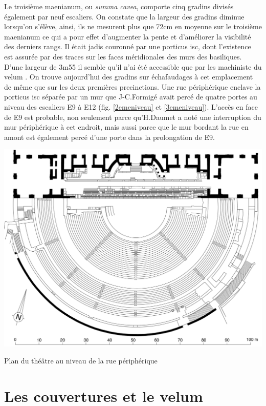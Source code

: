 		
		Le troisième \gls{maenianum}, ou \textit{summa cavea}, comporte cinq gradins divisés également par neuf escaliers. On constate que la largeur des gradins diminue lorsqu'on s'élève, ainsi, ils ne mesurent plus que 72cm en moyenne sur le troisième \gls{maenianum} ce qui a pour effet d'augmenter la pente et d'améliorer la visibilité des derniers rangs. Il était jadis couronné par une \gls{porticus isc}, dont l'existence est assurée par des traces sur les faces méridionales des murs des \glspl{basilique}. D'une largeur de 3m55 il semble qu'il n'ai été accessible que par les machiniste du \gls{velum} \cite{formige}. On trouve aujourd'hui des gradins sur échafaudages à cet emplacement de même que sur les deux premières \glspl{precinction}. Une rue périphérique enclave la \gls{porticus isc} séparée par un mur que J-C.Formigé avait percé de quatre portes au niveau des escaliers E9 à E12 (fig. \ref{2emeniveau} et \ref{3emeniveau}). L'accès en face de E9 est probable, non seulement parce qu'H.Daumet a noté une interruption du mur périphérique à cet endroit, mais aussi parce que le mur bordant la rue en amont est également percé d'une porte dans la prolongation de E9.


	\begin{figureth}
		\includegraphics[width=\linewidth]{images/3emeniveau}
		\caption[Vue de dessus - 3ème niveau]{Plan du théâtre au niveau de la rue périphérique \cite[Pl. XIX]{orangePl}}
		\label{3emeniveau}
	\end{figureth}	
		
		
\section{Les couvertures et le velum}
		
